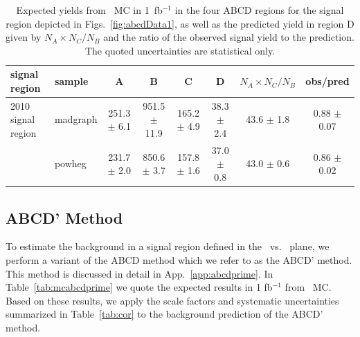 \begin{table}[hbt]
\begin{center}
\caption{\label{tab:mcabcd} Expected yields from \ttbar\ MC in 1~fb$^{-1}$ in the four
ABCD regions for the signal region depicted in Figs.~\ref{fig:abcdData1},
as well as the predicted yield in region D given by $N _A \times N_C / N_B$ and the ratio of 
the observed signal yield to the prediction. The quoted uncertainties are statistical only.
}
\begin{tabular}{llccccc|c}
\hline
signal region &           sample  &                A  &                B  &                C  &                D  & $N _A \times N_C / N_B$   & obs/pred\\
\hline

\hline

2010 signal region      &   madgraph  & 251.3  $\pm$  6.1  &951.5  $\pm$  11.9  & 165.2  $\pm$  4.9  & 38.3  $\pm$  2.4  & 43.6  $\pm$  1.8  &0.88  $\pm$  0.07 \\
                        &   powheg    & 231.7  $\pm$  2.0  &850.6  $\pm$  3.7   & 157.8  $\pm$  1.6  & 37.0  $\pm$  0.8  & 43.0  $\pm$  0.6  &0.86  $\pm$  0.02 \\

%
%
%
%
\hline
\end{tabular}
\end{center}
\end{table}

\subsection{ABCD' Method}

To estimate the background in a signal region defined in the \met\ vs. \Ht\ plane, we perform
a variant of the ABCD method which we refer to as the ABCD' method. This method is discussed in detail
in App.~\ref{app:abcdprime}. In Table~\ref{tab:mcabcdprime} we quote the expected results in 1 fb$^{-1}$
from \ttbar\ MC. Based on these results, we apply the scale factors and systematic uncertainties
summarized in Table~\ref{tab:cor} to the background prediction of the ABCD' method.

